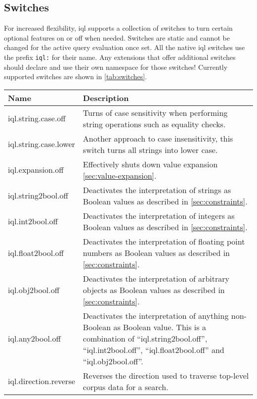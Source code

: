\documentclass[11pt,a4paper]{report}
\begin{document}
\subsection{Switches}
\label{sec:json-ld-switches}
For increased flexibility, \ac{iql} supports a collection of switches to turn certain optional features on or off when needed. Switches are static and cannot be changed for the active query evaluation once set. All the native \ac{iql} switches use the prefix \texttt{iql:} for their name. Any extensions that offer additional switches should declare and use their own namespace for those switches! Currently supported switches are shown in \cref{tab:switches}.

\begin{table}[!htb]
\noindent\begin{tabular}{|p{}|p{}|}
\hline 
\textbf{Name}	& \textbf{Description} \\ 
\hline 
\hline
iql.string.case.off         & Turns of case sensitivity when performing string operations such as equality checks.  \\ 
\hline
iql.string.case.lower       & Another approach to case insensitivity, this switch turns all strings into lower case.  \\ 
\hline
iql.expansion.off           & Effectively shuts down value expansion \cref{sec:value-expansion}.  \\ 
\hline
iql.string2bool.off         & Deactivates the interpretation of strings as Boolean values as described in \cref{sec:constraints}.  \\ 
\hline
iql.int2bool.off            & Deactivates the interpretation of integers as Boolean values as described in \cref{sec:constraints}.  \\ 
\hline
iql.float2bool.off          & Deactivates the interpretation of floating point numbers as Boolean values as described in \cref{sec:constraints}.  \\ 
\hline
iql.obj2bool.off            & Deactivates the interpretation of arbitrary objects as Boolean values as described in \cref{sec:constraints}.  \\ 
\hline
iql.any2bool.off            & Deactivates the interpretation of anything non-Boolean as Boolean value. This is a combination of ``iql.string2bool.off'', ``iql.int2bool.off'', ``iql.float2bool.off'' and  ``iql.obj2bool.off''.  \\ 
\hline
iql.direction.reverse       & Reverses the direction used to traverse top-level corpus data for a search.  \\ 

\end{tabular}
\end{table}
\end{document}
